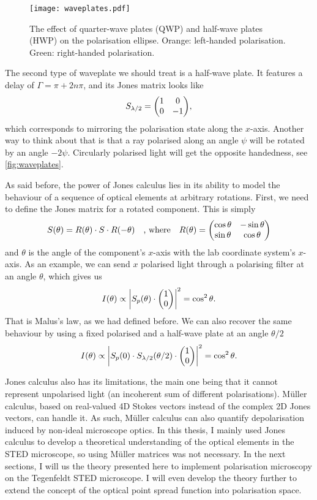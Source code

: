 \begin{figure}
	\centering
	\texttt{[image: waveplates.pdf]}
	\caption{
		The effect of quarter-wave plates (QWP) and half-wave plates (HWP) on the polarisation ellipse. Orange: left-handed polarisation. Green: right-handed polarisation.
	}
	\label{fig:waveplates}
\end{figure}

The second type of waveplate we should treat is a half-wave plate. It features a delay of $ \Gamma = \pi + 2n\pi $, and its Jones matrix looks like
\begin{equation}
	S_\hwp = \mqty(1 & 0 \\ 0 & -1),
\end{equation}
which corresponds to mirroring the polarisation state along the $ x $-axis. Another way to think about that is that a ray polarised along an angle $ \psi $ will be rotated by an angle $ -2\psi $. Circularly polarised light will get the opposite handedness, see \autoref{fig:waveplates}.

As said before, the power of Jones calculus lies in its ability to model the behaviour of a sequence of optical elements at arbitrary rotations. First, we need to define the Jones matrix for a rotated component. This is simply
\begin{equation}
	S(\theta) = R(\theta) \cdot S \cdot R(-\theta) 
	\qq{, where} 
	R(\theta) = \mqty(\cos\theta & -\sin\theta \\ \sin\theta & \cos\theta)
\end{equation}
and $ \theta $ is the angle of the component's $ x $-axis with the lab coordinate system's $ x $-axis. 
As an example, we can send $ x $ polarised light through a polarising filter at an angle $ \theta $, which gives us
\begin{equation}
	I(\theta) \propto \abs{S_p(\theta) \cdot \mqty(1 \\ 0)}^2 = \cos^2\theta.
\end{equation}
That is Malus's law, as we had defined before. We can also recover the same behaviour by using a fixed polarised and a half-wave plate at an angle $ \theta/2 $
\begin{equation}
	I(\theta) \propto \abs{S_p(0) \cdot S_\hwp(\theta/2) \cdot \mqty(\admat{1 \\ 0})}^2 = \cos^2\theta.
\end{equation}

Jones calculus also has its limitations, the main one being that it cannot represent unpolarised light (an incoherent sum of different polarisations). Müller calculus, based on real-valued 4D Stokes vectors instead of the complex 2D Jones vectors, can handle it. As such, Müller calculus can also quantify depolarisation induced by non-ideal microscope optics. In this thesis, I mainly used Jones calculus to develop a theoretical understanding of the optical elements in the STED microscope, so using Müller matrices was not necessary. In the next sections, I will us the theory presented here to implement polarisation microscopy on the Tegenfeldt STED microscope. I will even develop the theory further to extend the concept of the optical point spread function into polarisation space.
